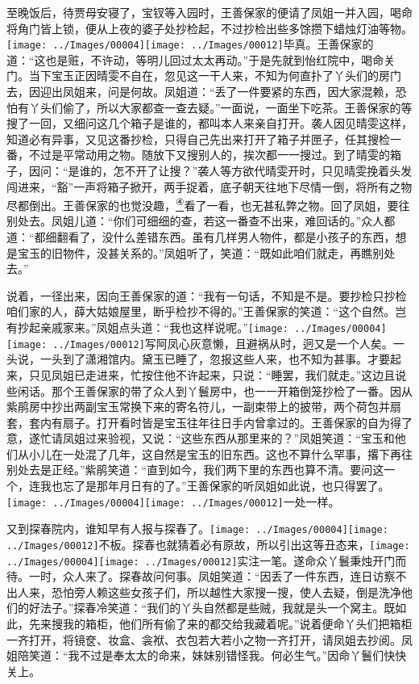 至晚饭后，待贾母安寝了，宝钗等入园时，王善保家的便请了凤姐一并入园，喝命将角门皆上锁，便从上夜的婆子处抄检起，不过抄检出些多馀攒下蜡烛灯油等物。{\texttt{[image: ../Images/00004]}\texttt{[image: ../Images/00012]}\footnotesize \kaishu 毕真。}王善保家的道：``这也是赃，不许动，等明儿回过太太再动。''于是先就到怡红院中，喝命关门。当下宝玉正因晴雯不自在，忽见这一干人来，不知为何直扑了丫头们的房门去，因迎出凤姐来，问是何故。凤姐道：``丢了一件要紧的东西，因大家混赖，恐怕有丫头们偷了，所以大家都查一查去疑。''一面说，一面坐下吃茶。王善保家的等搜了一回，又细问这几个箱子是谁的，都叫本人来亲自打开。袭人因见晴雯这样，知道必有异事，又见这番抄检，只得自己先出来打开了箱子并匣子，任其搜检一番，不过是平常动用之物。随放下又搜别人的，挨次都一一搜过。到了晴雯的箱子，因问：``是谁的，怎不开了让搜？''袭人等方欲代晴雯开时，只见晴雯挽着头发闯进来，``豁''一声将箱子掀开，两手捉着，底子朝天往地下尽情一倒，将所有之物尽都倒出。王善保家的也觉没趣，\href{../Text/part0078_split_000.html\#lnkback_4_a}{\textsuperscript{④}}看了一看，也无甚私弊之物。回了凤姐，要往别处去。凤姐儿道：``你们可细细的查，若这一番查不出来，难回话的。''众人都道：``都细翻看了，没什么差错东西。虽有几样男人物件，都是小孩子的东西，想是宝玉的旧物件，没甚关系的。''凤姐听了，笑道：``既如此咱们就走，再瞧别处去。''

说着，一径出来，因向王善保家的道：``我有一句话，不知是不是。要抄检只抄检咱们家的人，薛大姑娘屋里，断乎检抄不得的。''王善保家的笑道：``这个自然。岂有抄起亲戚家来。''凤姐点头道：``我也这样说呢。''{\texttt{[image: ../Images/00004]}\texttt{[image: ../Images/00012]}\footnotesize \kaishu 写阿凤心灰意懒，且避祸从时，迥又是一个人矣。}一头说，一头到了潇湘馆内。黛玉已睡了，忽报这些人来，也不知为甚事。才要起来，只见凤姐已走进来，忙按住他不许起来，只说：``睡罢，我们就走。''这边且说些闲话。那个王善保家的带了众人到丫鬟房中，也一一开箱倒笼抄检了一番。因从紫鹃房中抄出两副宝玉常换下来的寄名符儿，一副束带上的披带，两个荷包并扇套，套内有扇子。打开看时皆是宝玉往年往日手内曾拿过的。王善保家的自为得了意，遂忙请凤姐过来验视，又说：``这些东西从那里来的？''凤姐笑道：``宝玉和他们从小儿在一处混了几年，这自然是宝玉的旧东西。这也不算什么罕事，撂下再往别处去是正经。''紫鹃笑道：``直到如今，我们两下里的东西也算不清。要问这一个，连我也忘了是那年月日有的了。''王善保家的听凤姐如此说，也只得罢了。{\texttt{[image: ../Images/00004]}\texttt{[image: ../Images/00012]}\footnotesize \kaishu 一处一样。}

又到探春院内，谁知早有人报与探春了。{\texttt{[image: ../Images/00004]}\texttt{[image: ../Images/00012]}\footnotesize \kaishu 不板。}探春也就猜着必有原故，所以引出这等丑态来，{\texttt{[image: ../Images/00004]}\texttt{[image: ../Images/00012]}\footnotesize \kaishu 实注一笔。}遂命众丫鬟秉烛开门而待。一时，众人来了。探春故问何事。凤姐笑道：``因丢了一件东西，连日访察不出人来，恐怕旁人赖这些女孩子们，所以越性大家搜一搜，使人去疑，倒是洗净他们的好法子。''探春冷笑道：``我们的丫头自然都是些贼，我就是头一个窝主。既如此，先来搜我的箱柜，他们所有偷了来的都交给我藏着呢。''说着便命丫头们把箱柜一齐打开，将镜奁、妆盒、衾袱、衣包若大若小之物一齐打开，请凤姐去抄阅。凤姐陪笑道：``我不过是奉太太的命来，妹妹别错怪我。何必生气。''因命丫鬟们快快关上。

